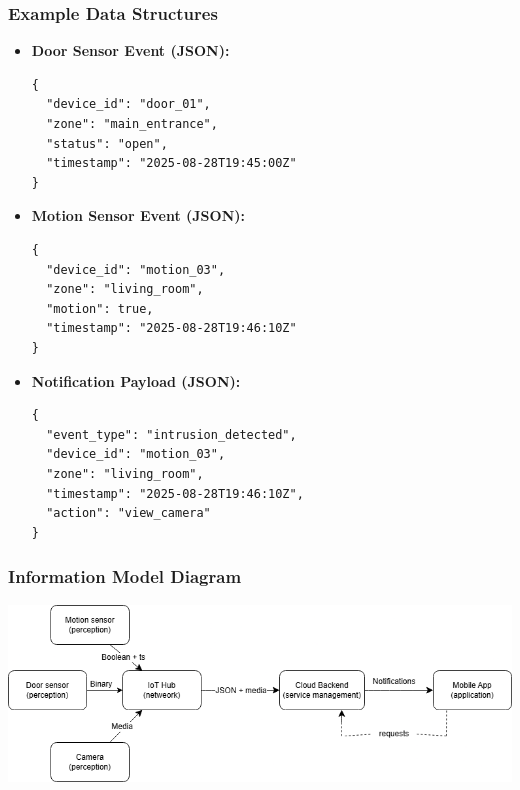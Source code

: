 \documentclass[conference]{IEEEtran}
\begin{document}
\subsubsection{Example Data Structures}
\begin{itemize}
    \item \textbf{Door Sensor Event (JSON):}
\begin{verbatim}
{
  "device_id": "door_01",
  "zone": "main_entrance",
  "status": "open",
  "timestamp": "2025-08-28T19:45:00Z"
}
\end{verbatim}

    \item \textbf{Motion Sensor Event (JSON):}
\begin{verbatim}
{
  "device_id": "motion_03",
  "zone": "living_room",
  "motion": true,
  "timestamp": "2025-08-28T19:46:10Z"
}
\end{verbatim}

    \item \textbf{Notification Payload (JSON):}
\begin{verbatim}
{
  "event_type": "intrusion_detected",
  "device_id": "motion_03",
  "zone": "living_room",
  "timestamp": "2025-08-28T19:46:10Z",
  "action": "view_camera"
}
\end{verbatim}
\end{itemize}


\subsubsection{Information Model Diagram}

\begin{center}
\centerline{\includegraphics[width=0.9\columnwidth]{information_model.png}}


\label{fig:information-model}
\end{center}
\end{document}
